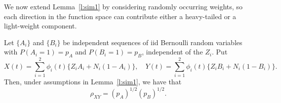 \documentclass[lineno]{biometrika}
\begin{document}
\medskip\medskip





We now extend Lemma~\ref{l:sim1} by considering randomly occurring
weights, so each direction in the function space can contribute either
a heavy-tailed or a light-weight component.

\begin{lemma} \label{l:sim2}
Let $\{A_i\}$ and $\{B_i\}$ be independent sequences of   iid Bernoulli
random variables with $P(A_i=1)=p_A$ and $P(B_i=1)=p_B$, independent of the $Z_i$.  Put
\[
X(t) = \sum_{i=1}^2 \phi_i(t)\{Z_iA_i + N_i(1-A_i)\}, \quad
Y(t) = \sum_{i=1}^2 \phi_i(t)\{Z_iB_i + N_i(1-B_i)\}.
\]
Then, under assumptions in Lemma~\ref{l:sim1}, we have that
\[
\rho_{XY} = (p_A)^{1/2}(p_B)^{1/2}.
\]
\end{lemma}
\end{document}
